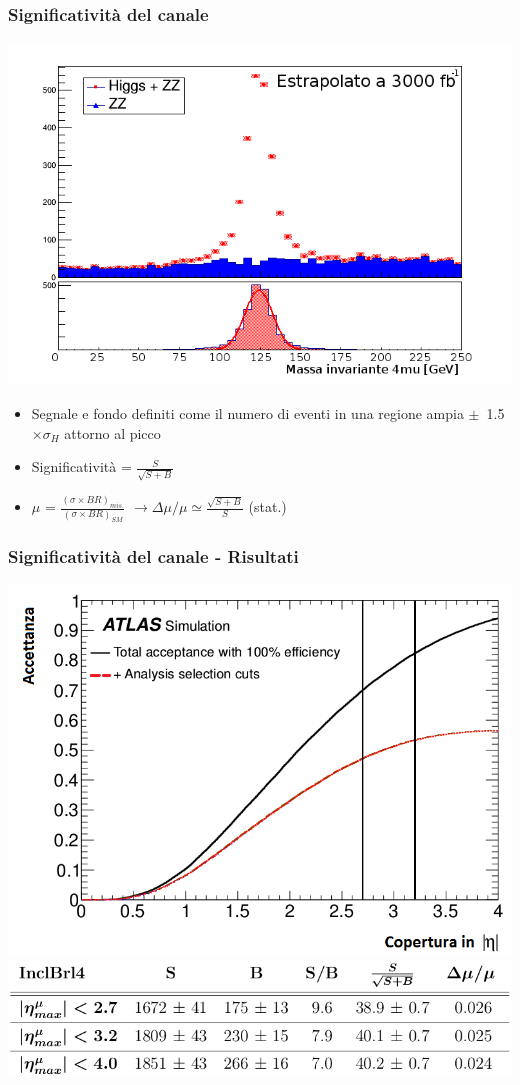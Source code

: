 \documentclass{beamer}
\begin{document}
\begin{frame}[t]
\frametitle{Significativit\`a del canale}
\begin{center}
\includegraphics[width=.5\textwidth]{SBInclBrl4_2}
\end{center}

\begin{itemize}
\item \small Segnale e fondo definiti come il numero di eventi in una regione ampia
\mbox{$\pm$ 1.5 $\times \sigma_{H}$} attorno al picco
\item \small Significativit\`a = $\frac{S}{\sqrt{S + B}}$
\item \small $\mu$ = $\frac{(\sigma \times BR)_{mis.}}{(\sigma \times BR)_{SM}}$ $\rightarrow 
\Delta\mu/\mu \simeq \frac{\sqrt{S + B}}{S}$ (stat.)
\end{itemize}
\end{frame}


\begin{frame}
\frametitle{Significativit\`a del canale - Risultati}
\centering
\includegraphics[width=.5\textwidth]{scopingAcceptance2}\\
\includegraphics[width=.9\textwidth]{significanceInclBrl4}\\
\begin{flushleft}
\end{flushleft}
\end{frame}
\end{document}
